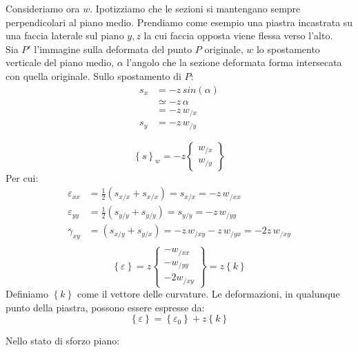 Consideriamo ora $w$. Ipotizziamo che le sezioni si mantengano sempre perpendicolari al piano medio. Prendiamo come esempio una piastra incastrata su una faccia laterale sul piano $y,z$ la cui faccia opposta viene flessa verso l'alto.\\
Sia $P'$ l'immagine sulla deformata del punto $P$ originale, $w$ lo spostamento verticale del piano medio, $\alpha$ l'angolo che la sezione deformata forma intersecata con quella originale. Sullo spostamento di $P$:
\begin{align*}
    s_x&=-z\,sin(\alpha)\\&\simeq-z\,\alpha\\&=-z\,w_{/x}\\
    s_y&=-z\,w_{/y}
\end{align*}

\begin{equation*}
    \left\{s
\right\}_{w}=-z\left\{
\begin{array}{c}
w_{/x} \\
w_{/y}
\end{array}
\right\}
\end{equation*}
Per cui:
\begin{align*}
    \varepsilon_{xx}&=\frac{1}{2}(s_{x/x}+s_{x/x})=s_{x/x}=-z\,w_{/xx}\\
     \varepsilon_{yy}&=\frac{1}{2}(s_{y/y}+s_{y/y})=s_{y/y}=-z\,w_{/yy}\\
      \gamma_{xy}&=(s_{x/y}+s_{y/x})=-z\,w_{/xy}-z\,w_{/yx}=-2z\,w_{/xy}\\
\end{align*}
\begin{equation*}
    \left\{\varepsilon
\right\}=z\left\{
\begin{array}{c}
-w_{/xx}\\
-w_{/yy}\\  -2w_{/xy}
\end{array}
\right\}
=z\left\{ k\right\}
\end{equation*}
Definiamo $\left\{ k\right\}$ come il vettore delle curvature. Le deformazioni, in qualunque punto della piastra, possono essere espresse da:
\begin{equation*}
    \left\{ \varepsilon\right\}=\left\{ \varepsilon_0\right\}+z\left\{ k\right\}
\end{equation*}

Nello stato di sforzo piano:

